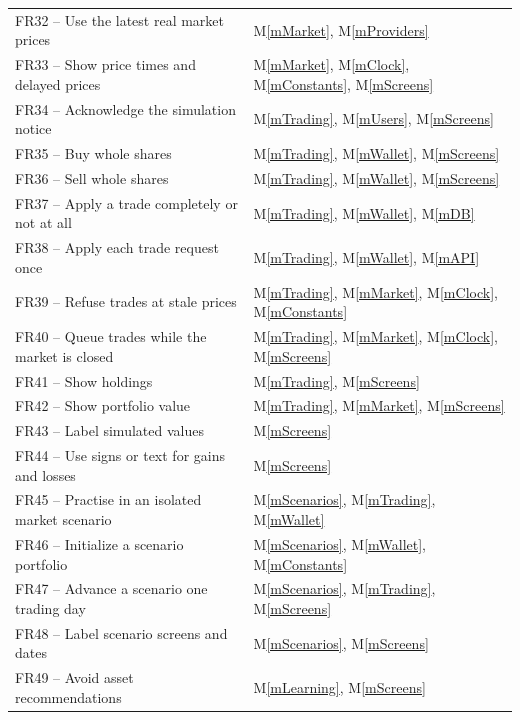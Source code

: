 \documentclass[12pt, titlepage]{article}
\newcommand{\mref}[1]{M\ref{#1}}
\begin{document}
\begin{longtable}{@{}p{}p{}@{}}
FR32 -- Use the latest real market prices & \mref{mMarket}, \mref{mProviders}\\ %
FR33 -- Show price times and delayed prices & \mref{mMarket}, \mref{mClock}, \mref{mConstants}, \mref{mScreens}\\ %
FR34 -- Acknowledge the simulation notice & \mref{mTrading}, \mref{mUsers}, \mref{mScreens}\\ %
FR35 -- Buy whole shares & \mref{mTrading}, \mref{mWallet}, \mref{mScreens}\\ %
FR36 -- Sell whole shares & \mref{mTrading}, \mref{mWallet}, \mref{mScreens}\\ %
FR37 -- Apply a trade completely or not at all & \mref{mTrading}, \mref{mWallet}, \mref{mDB}\\ %
FR38 -- Apply each trade request once & \mref{mTrading}, \mref{mWallet}, \mref{mAPI}\\ %
FR39 -- Refuse trades at stale prices & \mref{mTrading}, \mref{mMarket}, \mref{mClock}, \mref{mConstants}\\ %
FR40 -- Queue trades while the market is closed & \mref{mTrading}, \mref{mMarket}, \mref{mClock}, \mref{mScreens}\\ %
FR41 -- Show holdings & \mref{mTrading}, \mref{mScreens}\\ %
FR42 -- Show portfolio value & \mref{mTrading}, \mref{mMarket}, \mref{mScreens}\\ %
FR43 -- Label simulated values & \mref{mScreens}\\ %
FR44 -- Use signs or text for gains and losses & \mref{mScreens}\\ %
FR45 -- Practise in an isolated market scenario & \mref{mScenarios}, \mref{mTrading}, \mref{mWallet}\\ %
FR46 -- Initialize a scenario portfolio & \mref{mScenarios}, \mref{mWallet}, \mref{mConstants}\\ %
FR47 -- Advance a scenario one trading day & \mref{mScenarios}, \mref{mTrading}, \mref{mScreens}\\ %
FR48 -- Label scenario screens and dates & \mref{mScenarios}, \mref{mScreens}\\ %
FR49 -- Avoid asset recommendations & \mref{mLearning}, \mref{mScreens}\\ %

\end{longtable}
\end{document}
